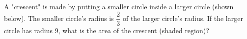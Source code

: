 A "crescent" is made by putting a smaller circle inside a larger circle (shown below). The smaller circle's radius is $\dfrac{2}{3}$ of the larger circle's radius. If the larger circle has radius $9$, what is the area of the crescent (shaded region)?
